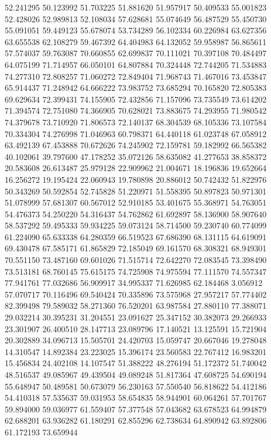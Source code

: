 52.241295
50.123992
51.703225
51.881620
51.957917
50.409533
55.001823
52.428026
52.989813
52.108034
57.628681
55.074649
56.487529
55.450730
55.091051
59.449123
55.678074
53.734289
56.102334
60.226984
63.627356
63.655538
62.108279
59.467392
64.404983
64.132052
59.958987
56.865611
57.574037
59.763087
70.660855
62.699837
70.111021
70.397108
70.484497
64.075199
71.714957
66.050101
64.807884
70.324448
72.744205
71.534883
74.277310
72.808257
71.060272
72.849404
71.968743
71.467016
73.453847
65.914437
71.248942
64.666222
73.983752
73.685294
70.165820
72.805383
69.629634
72.399431
74.155905
72.432856
71.157096
73.735549
73.614202
71.394574
72.751080
74.366905
70.628021
73.883675
74.293955
71.980542
74.379678
73.710920
71.806573
72.140137
68.304539
68.105336
73.107584
70.334304
74.276998
71.046963
60.798371
64.440118
61.023748
67.058912
63.492139
67.453888
70.672626
74.245902
72.159781
59.182992
66.565382
40.102061
39.797600
47.178252
35.072126
58.635082
41.277653
38.858372
20.583608
26.613487
25.979128
22.909962
21.004671
18.196836
19.652664
16.256272
19.195424
22.060943
19.780898
20.886012
50.742432
51.822976
50.343269
50.592854
52.745828
51.220971
51.558395
50.897823
50.971301
51.078999
57.681307
60.567012
52.910185
53.401675
55.368971
54.763051
54.476373
54.250220
54.316437
54.762862
61.692897
58.136900
58.907640
58.537292
59.495333
59.934225
59.073124
58.714500
59.230740
60.774099
61.224090
65.633338
64.280359
66.519523
67.686390
68.131115
64.619091
69.430478
67.585171
61.865829
72.185049
69.161570
68.308321
68.949301
70.551150
73.487160
69.601026
71.515714
72.642270
72.083545
73.398490
73.513181
68.760145
75.615175
74.725908
74.975594
77.111570
74.557347
77.941761
77.032686
56.909917
34.995337
71.626985
62.184468
3.056912
57.070717
70.116496
69.540424
70.335896
73.575968
27.957217
57.774402
82.399498
79.589032
58.271360
76.520201
63.987584
27.880110
77.388071
29.032214
30.395231
31.204551
23.091627
25.347152
30.382073
29.266933
23.301907
26.400510
28.147713
23.089796
17.140521
13.125591
15.721904
20.302889
34.096713
15.505701
24.420703
15.059747
20.667046
19.278048
14.310547
14.892384
23.223025
15.396174
23.560583
22.767412
16.983201
15.456834
24.402108
14.107547
51.388222
48.276194
51.172372
51.740042
48.516537
49.085967
49.439504
49.089248
51.817364
47.608725
54.690194
55.648947
50.489581
50.673079
56.230163
57.550540
56.818622
54.412186
54.410318
57.535637
59.031953
58.654835
58.944901
60.064261
57.701767
59.894000
59.036977
61.559407
57.377548
57.043682
63.678523
64.994879
62.688201
63.936282
61.180291
62.855296
62.738634
64.890942
63.892806
61.172193
73.659944
